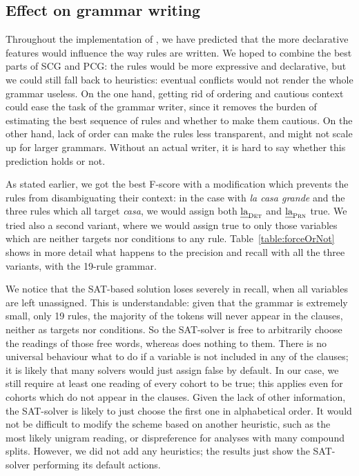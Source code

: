 \subsection{Effect on grammar writing}


Throughout the implementation of \satcg{}, we have predicted that the more declarative features would influence the way rules are written.
We hoped to combine the best parts of SCG and PCG:
the rules would be more expressive and declarative,
but we could still fall back to heuristics: eventual
conflicts would not render the whole grammar useless.
On the one hand, getting rid of ordering and cautious context could ease the task of the grammar writer, since it removes the burden of estimating the best sequence of rules and whether to make them cautious. On the other hand, lack of order can make the rules less transparent, and might not scale up for larger grammars.
Without an actual \onlycg{} writer, it is hard to say whether this prediction holds or not.

As stated earlier, we got the best F-score with a modification which prevents the rules
from disambiguating their context: in the case with {\em la casa grande} and the
three rules which all target {\em casa}, we would assign both $\text{\em la}_{\text{\sc Det}}${} and $\text{\em la}_{\text{\sc Prn}}${} true.
We tried also a second variant, where we would assign true to only those variables which are
neither targets nor conditions to any rule.
Table~\ref{table:forceOrNot} shows in more detail what happens to the precision and recall with all the three variants, with the 19-rule grammar.



We notice that the SAT-based solution loses severely in recall,
when all variables are left unassigned. This is understandable: given that
the grammar is extremely small, only 19 rules, the majority of the tokens will
never appear in the clauses, neither as targets nor conditions. So the SAT-solver is free to
arbitrarily choose the readings of those free words, whereas  does nothing to them.
There is no universal behaviour what to do if a variable is not included in any of the clauses; it is likely that many solvers would just assign false by default. In our case, we still require at least one reading of every cohort to be true; this applies even for cohorts which do not appear in the clauses.
Given the lack of other information, the SAT-solver is likely to just choose the first one in alphabetical order. It would not be difficult to modify the scheme based on another heuristic, such as the most likely unigram reading, or dispreference for analyses with many compound splits. However, we did not add any heuristics; the results just show the SAT-solver performing its default actions.

